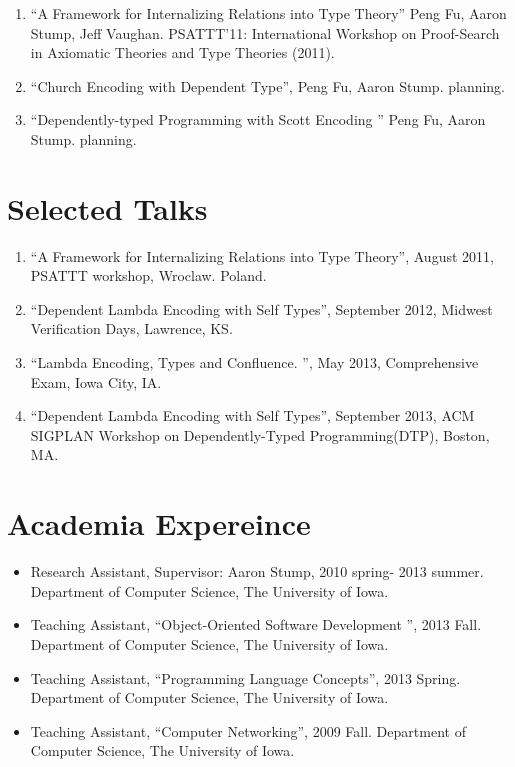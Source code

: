 \documentclass[10pt]{article}
\begin{document}
\begin{enumerate}
\item ``A Framework for Internalizing Relations into Type Theory'' Peng Fu, Aaron Stump, Jeff Vaughan. PSATTT'11: International Workshop on Proof-Search in Axiomatic Theories and Type Theories (2011). 
\item ``Church Encoding with Dependent Type'', Peng Fu, Aaron Stump. planning.
\item ``Dependently-typed Programming with Scott Encoding '' Peng Fu, Aaron Stump. planning.
  
\end{enumerate}

\section*{Selected Talks}

\begin{enumerate}

\item ``A Framework for Internalizing Relations into Type Theory'', August 2011, PSATTT workshop, Wroclaw. Poland. 
\item ``Dependent Lambda Encoding with Self Types'', September 2012, Midwest Verification Days, Lawrence, KS.
\item ``Lambda Encoding, Types and Confluence. '', May 2013, Comprehensive Exam, Iowa City, IA.
\item ``Dependent Lambda Encoding with Self Types'', September 2013, ACM SIGPLAN Workshop on Dependently-Typed Programming(DTP), Boston, MA.
\end{enumerate}

\section*{Academia Expereince}

\begin{itemize}
\item Research Assistant, Supervisor: Aaron Stump, 2010 spring- 2013 summer. Department of Computer Science, The University of Iowa.
\item Teaching Assistant,  ``Object-Oriented Software Development '', 2013 Fall. Department of Computer Science, The University of Iowa.
\item Teaching Assistant,  ``Programming Language Concepts'', 2013 Spring. Department of Computer Science, The University of Iowa.
  \item Teaching Assistant, ``Computer Networking'', 2009 Fall. Department of Computer Science, The University of Iowa.
\end{itemize}
\end{document}
